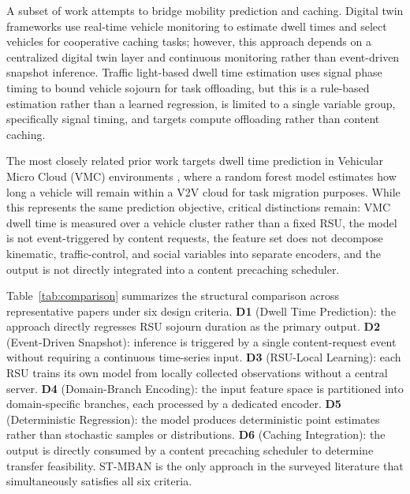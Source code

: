 \documentclass[journal]{IEEEtran}
\begin{document}
A subset of work attempts to bridge mobility prediction and caching.
Digital twin frameworks \cite{DT2026} use real-time vehicle monitoring to estimate dwell times and select vehicles for cooperative caching tasks; however, this approach depends on a centralized digital twin layer and continuous monitoring rather than event-driven snapshot inference.
Traffic light-based dwell time estimation \cite{TaskMig2023} uses signal phase timing to bound vehicle sojourn for task offloading, but this is a rule-based estimation rather than a learned regression, is limited to a single variable group, specifically signal timing, and targets compute offloading rather than content caching.

The most closely related prior work targets dwell time prediction in Vehicular Micro Cloud (VMC) environments \cite{VMCdwell2023}, where a random forest model estimates how long a vehicle will remain within a V2V cloud for task migration purposes.
While this represents the same prediction objective, critical distinctions remain: VMC dwell time is measured over a vehicle cluster rather than a fixed RSU, the model is not event-triggered by content requests, the feature set does not decompose kinematic, traffic-control, and social variables into separate encoders, and the output is not directly integrated into a content precaching scheduler.

Table~\ref{tab:comparison} summarizes the structural comparison across representative papers under six design criteria.
\textbf{D1} (Dwell Time Prediction): the approach directly regresses RSU sojourn duration as the primary output.
\textbf{D2} (Event-Driven Snapshot): inference is triggered by a single content-request event without requiring a continuous time-series input.
\textbf{D3} (RSU-Local Learning): each RSU trains its own model from locally collected observations without a central server.
\textbf{D4} (Domain-Branch Encoding): the input feature space is partitioned into domain-specific branches, each processed by a dedicated encoder.
\textbf{D5} (Deterministic Regression): the model produces deterministic point estimates rather than stochastic samples or distributions.
\textbf{D6} (Caching Integration): the output is directly consumed by a content precaching scheduler to determine transfer feasibility.
ST-MBAN is the only approach in the surveyed literature that simultaneously satisfies all six criteria.
\end{document}
